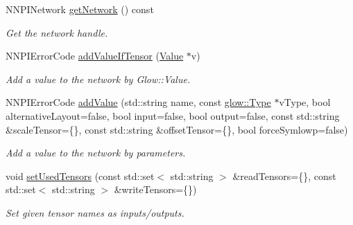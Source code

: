 \begin{DoxyCompactItemize}
\mbox{\label{classglow_1_1_n_n_p_i_importer_ae6bd38b44403f14da3f383bb155a3cb5}} 
N\+N\+P\+I\+Network \hyperlink{classglow_1_1_n_n_p_i_importer_ae6bd38b44403f14da3f383bb155a3cb5}{get\+Network} () const
\begin{DoxyCompactList}\small\item\em Get the network handle. \end{DoxyCompactList}\item 
\mbox{\label{classglow_1_1_n_n_p_i_importer_a0be74d279d10418bc0fff7b9e48bdebc}} 
N\+N\+P\+I\+Error\+Code \hyperlink{classglow_1_1_n_n_p_i_importer_a0be74d279d10418bc0fff7b9e48bdebc}{add\+Value\+If\+Tensor} (\hyperlink{classglow_1_1_value}{Value} $\ast$v)
\begin{DoxyCompactList}\small\item\em Add a value to the network by Glow\+::\+Value. \end{DoxyCompactList}\item 
\mbox{\label{classglow_1_1_n_n_p_i_importer_ae3b98c4f0d3fcb663e7e6191ef4a4c4b}} 
N\+N\+P\+I\+Error\+Code \hyperlink{classglow_1_1_n_n_p_i_importer_ae3b98c4f0d3fcb663e7e6191ef4a4c4b}{add\+Value} (std\+::string name, const \hyperlink{structglow_1_1_type}{glow\+::\+Type} $\ast$v\+Type, bool alternative\+Layout=false, bool input=false, bool output=false, const std\+::string \&scale\+Tensor=\{\}, const std\+::string \&offset\+Tensor=\{\}, bool force\+Symlowp=false)
\begin{DoxyCompactList}\small\item\em Add a value to the network by parameters. \end{DoxyCompactList}\item 
\mbox{\label{classglow_1_1_n_n_p_i_importer_a3dddd9aa8bf1683202db584b1680562f}} 
void \hyperlink{classglow_1_1_n_n_p_i_importer_a3dddd9aa8bf1683202db584b1680562f}{set\+Used\+Tensors} (const std\+::set$<$ std\+::string $>$ \&read\+Tensors=\{\}, const std\+::set$<$ std\+::string $>$ \&write\+Tensors=\{\})
\begin{DoxyCompactList}\small\item\em Set given tensor names as inputs/outputs. \end{DoxyCompactList}\item 
\mbox{\label{classglow_1_1_n_n_p_i_importer_a17439e3c3e7bd40b47b6fd27fa898da1}} 

\end{DoxyCompactItemize}
